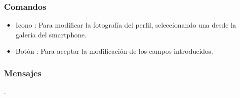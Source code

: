 \subsubsection{Comandos}	
	\begin{itemize}
		\item Icono : Para modificar la fotografía del perfil,
		seleccionando una desde la galería del smartphone.
		\item Botón : Para aceptar la modificación de los
		campos introducidos.
	\end{itemize}

\subsubsection{Mensajes}
	\noindent
	.



\pagebreak





					
